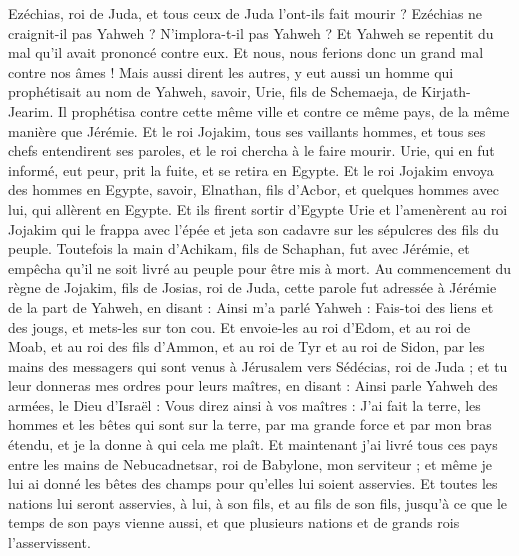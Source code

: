 \begin{multicols}{2}
Ezéchias, roi de Juda, et tous ceux de Juda l'ont-ils fait mourir ? Ezéchias ne craignit-il pas Yahweh ? N'implora-t-il pas Yahweh ? Et Yahweh se repentit du mal qu'il avait prononcé contre eux. Et nous, nous ferions donc un grand mal contre nos âmes !
Mais aussi dirent les autres, y eut aussi un homme qui prophétisait au nom de Yahweh, savoir, Urie, fils de Schemaeja, de Kirjath-Jearim. Il prophétisa contre cette même ville et contre ce même pays, de la même manière que Jérémie.
Et le roi Jojakim, tous ses vaillants hommes, et tous ses chefs entendirent ses paroles, et le roi chercha à le faire mourir. Urie, qui en fut informé, eut peur, prit la fuite, et se retira en Egypte.
Et le roi Jojakim envoya des hommes en Egypte, savoir, Elnathan, fils d'Acbor, et quelques hommes avec lui, qui allèrent en Egypte.
Et ils firent sortir d'Egypte Urie et l'amenèrent au roi Jojakim qui le frappa avec l'épée et jeta son cadavre sur les sépulcres des fils du peuple.
Toutefois la main d'Achikam, fils de Schaphan, fut avec Jérémie, et empêcha qu'il ne soit livré au peuple pour être mis à mort.
\VerseOne{}Au commencement du règne de Jojakim, fils de Josias, roi de Juda, cette parole fut adressée à Jérémie de la part de Yahweh, en disant :
Ainsi m'a parlé Yahweh : Fais-toi des liens et des jougs, et mets-les sur ton cou.
Et envoie-les au roi d'Edom, et au roi de Moab, et au roi des fils d'Ammon, et au roi de Tyr et au roi de Sidon, par les mains des messagers qui sont venus à Jérusalem vers Sédécias, roi de Juda ;
et tu leur donneras mes ordres pour leurs maîtres, en disant : Ainsi parle Yahweh des armées, le Dieu d'Israël : Vous direz ainsi à vos maîtres :
J'ai fait la terre, les hommes et les bêtes qui sont sur la terre, par ma grande force et par mon bras étendu, et je la donne à qui cela me plaît.
Et maintenant j'ai livré tous ces pays entre les mains de Nebucadnetsar, roi de Babylone, mon serviteur ; et même je lui ai donné les bêtes des champs pour qu'elles lui soient asservies.
Et toutes les nations lui seront asservies, à lui, à son fils, et au fils de son fils, jusqu'à ce que le temps de son pays vienne aussi, et que plusieurs nations et de grands rois l'asservissent.

\end{multicols}
